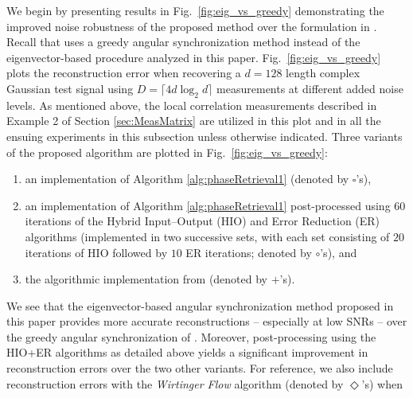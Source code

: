 We begin by presenting results in Fig.~\ref{fig:eig_vs_greedy} demonstrating the improved noise
robustness of the proposed method over the formulation in \cite{IVW2015_FastPhase}. Recall that
\cite{IVW2015_FastPhase} uses a greedy angular synchronization method instead of the
eigenvector-based procedure analyzed in this paper. Fig.~\ref{fig:eig_vs_greedy} plots the
reconstruction error when recovering a $d=128$ length complex Gaussian test signal using $D=\lceil
4d\log_2 d\rceil$ measurements at different added noise levels. As mentioned above,
the local correlation measurements described in Example 2 of Section \ref{sec:MeasMatrix} are
utilized in this plot and in all the ensuing experiments in this subsection unless otherwise
indicated. Three variants of the proposed algorithm are plotted in Fig.~\ref{fig:eig_vs_greedy}:
\begin{enumerate}
    \item an implementation of Algorithm \ref{alg:phaseRetrieval1} (denoted by $\square$'s),
    \item an implementation of Algorithm \ref{alg:phaseRetrieval1} post-processed using 
        $60$ iterations of the Hybrid Input--Output (HIO) and Error Reduction (ER) algorithms
        (implemented in two successive sets, with each set consisting of $20$ iterations of HIO followed 
        by $10$ ER iterations; denoted by $\circ$'s), and 
    \item the algorithmic implementation from \cite{IVW2015_FastPhase} (denoted by $+$'s). 
\end{enumerate}
%
We see that the eigenvector-based angular synchronization method proposed in this paper provides
more accurate reconstructions -- especially at low SNRs -- over the greedy angular synchronization
of \cite{IVW2015_FastPhase}. Moreover, post-processing using the HIO+ER algorithms as detailed above yields
a significant improvement in reconstruction errors over the two other variants. For reference, we also
include reconstruction errors with the {\em Wirtinger Flow} algorithm (denoted by $\Diamond$'s) when
